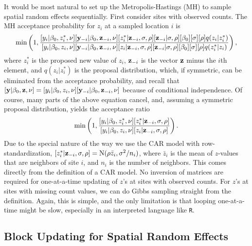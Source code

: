 \documentclass[11pt, titlepage]{article}
\begin{document}
\begin{flushleft}
\begin{onehalfspace}
It would be most natural to set up the Metropolis-Hastings (MH) to sample spatial random effects sequentially. First consider sites with observed counts. The MH acceptance probability for $z_{i}$ at a sampled location $i$ is
$$
\min\left(1,\frac{[y_{i}|\beta_{0},z^{*}_{i},\nu][\mathbf{y}_{-i}|\beta_{0},\mathbf{z}_{-i},\nu][z^{*}_{i}|\mathbf{z}_{-i},\sigma,\rho][\mathbf{z}_{-i}|\sigma,\rho][\beta_{0}] [\sigma] [\rho]q(z_{i}|z_{i}^{*})}
	{[y_{i}|\beta_{0},z_{i},\nu][\mathbf{y}_{-i}|\beta_{0},\mathbf{z}_{-i},\nu][z_{i}|\mathbf{z}_{-i},\sigma,\rho][\mathbf{z}_{-i}|\sigma,\rho][\beta_{0}] [\sigma] [\rho]q(z_{i}^{*}|z_{i})}\right),
$$
where $z_{i}^{*}$ is the proposed new value of $z_{i}$,  $\mathbf{z}_{-i}$ is the vector $\mathbf{z}$ minus the $i$th element, and $q(z_{i}|z_{i}^{*})$ is the proposal distribution, which, if symmetric, can be eliminated from the acceptance probability, and recall that $[\mathbf{y}|\beta_{0},\mathbf{z},\nu] = [y_{i}|\beta_{0},z_{i},\nu][\mathbf{y}_{-i}|\beta_{0},\mathbf{z}_{-i},\nu]$ because of conditional independence. Of course, many parts of the above equation cancel, and, assuming a symmetric proposal distribution, yields the acceptance ratio
$$
\min\left(1,\frac{[y_{i}|\beta_{0},z^{*}_{i},\nu][z^{*}_{i}|\mathbf{z}_{-i},\sigma,\rho]}
	{[y_{i}|\beta_{0},z_{i},\nu][z_{i}|\mathbf{z}_{-i},\sigma,\rho]}\right).
$$
Due to the special nature of the way we use the CAR model with row-standardization, $[z^{*}_{i}|\mathbf{z}_{-i},\sigma,\rho] = \textrm{N}(\rho\bar{z}_{i},\sigma^{2}/n_{i})$, where $\bar{z}_{i}$ is the mean of $z$-values that are neighbors of site $i$, and $n_{i}$ is the number of neighbors. This comes directly from the definition of a CAR model. No inversion of matrices are required for one-at-a-time updating of $z$'s at sites with observed counts.  For $z$'s at sites with missing count values, we can do Gibbs sampling straight from the definition.  Again, this is simple, and the only limitation is that looping one-at-a-time might be slow, especially in an interpreted language like \texttt{R}.


\subsection*{Block Updating for Spatial Random Effects}


\end{onehalfspace}
\end{flushleft}
\end{document}
